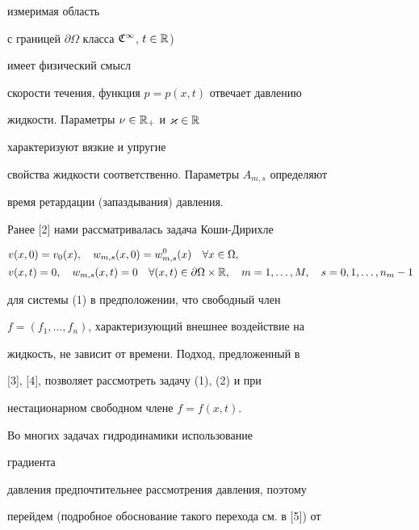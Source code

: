 измеримая область


с границей $\partial\Omega$ класса $\frak C^\infty$, $t\in\Bbb R$)


имеет физический смысл


скорости течения, функция $p=p(x,t)$ отвечает давлению


жидкости. Параметры $\nu\in\Bbb R_+$ и $\varkappa\in\Bbb R$


характеризуют вязкие и упругие


свойства жидкости соответственно. Параметры $A_{m,s}$ определяют


время ретардации (запаздывания) давления.





Ранее [2] нами рассматривалась задача Коши-Дирихле


\begin{equation}


\begin{split}


& v(x,0)=v_0(x),\quad w_{m,s}(x,0)=w^0_{m,s}(x)\quad


\forall x\in\Omega,\\


& v(x,t)=0,\quad w_{m,s}(x,t)=0\quad


\forall (x,t)\in\partial\Omega\times\Bbb R,\quad


m=1,\dotsc,M,\quad s=0,1,\dotsc,n_m-1


\end{split}


\end{equation}


для системы (1) в предположении, что свободный член


$f=(f_1,\dotsc,f_n)$, характеризующий внешнее воздействие на


жидкость, не зависит от времени. Подход, предложенный в


[3], [4], позволяет рассмотреть задачу (1), (2) и при


нестационарном свободном члене $f=f(x,t)$.





Во многих задачах гидродинамики использование


градиента


давления предпочтительнее рассмотрения давления, поэтому


перейдем (подробное обоснование такого перехода см. в [5]) от


